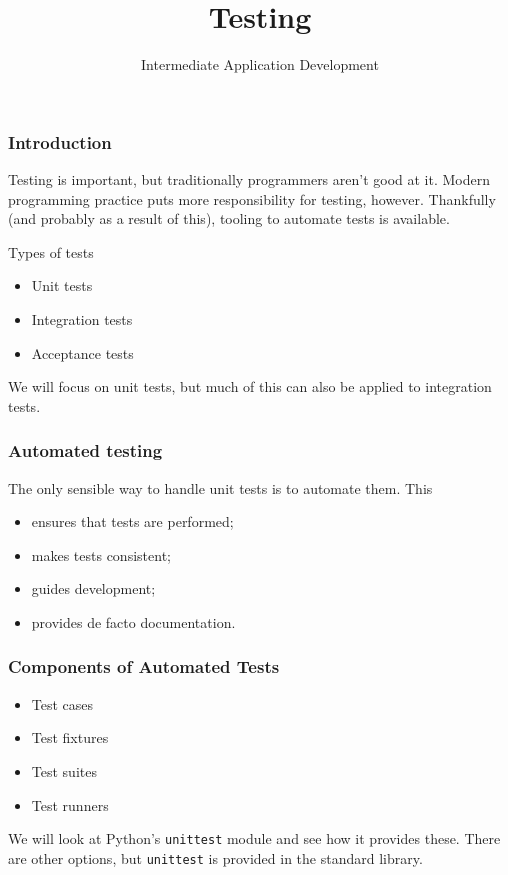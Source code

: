 \documentclass[10pt]{beamer}
\title{Testing}
\author[IN608]{Intermediate Application Development}
\institute[Otago Polytechnic]{
  Otago Polytechnic \\
  Dunedin, New Zealand \\
  Kaiako: Tom Clark
}
\date{}
\begin{document}
\begin{frame}[plain]
  \titlepage
\end{frame}

\begin{frame}
  \frametitle{Introduction}
  
  Testing is important, but traditionally programmers aren't good at it. Modern
  programming practice puts more responsibility for testing, however. Thankfully
  (and probably as a result of this), tooling to automate tests is available.
  
  \vspace{5mm}
  Types of tests
  \begin{itemize}
    \item Unit tests
    \item Integration tests
    \item Acceptance tests
  \end{itemize}
  We will focus on unit tests, but much of this can also be applied to 
  integration tests. 
\end{frame}

\begin{frame}
  \frametitle{Automated testing}
  
  The only sensible way to handle unit tests is to automate them. This
  
  \begin{itemize}
    \item ensures that tests are performed;
    \item makes tests consistent;
    \item guides development;
    \item provides de facto documentation.
  \end{itemize}
    
  \end{frame}

\begin{frame}
  \frametitle{Components of Automated Tests}
  
  
  
  \begin{itemize}
    \item Test cases
    \item Test fixtures
    \item Test suites
    \item Test runners
  \end{itemize}
  
  We will look at Python's \texttt{unittest} module and see how it provides these.
  There are other options, but \texttt{unittest} is provided in the standard library. 
    
  \end{frame}
\end{document}

